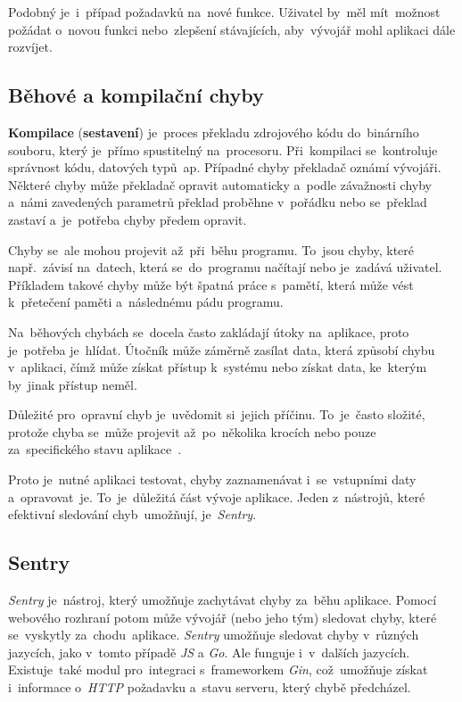 \documentclass[11pt,a4paper]{report}
\let\oldacrshort\acrshort
\renewcommand{\acrshort}[1]{\emph{\normalsize\color[rgb]{0,0,0}\noindent\oldacrshort{#1}}}
\begin{document}
                Podobný je~i~případ požadavků na~nové funkce. Uživatel by~měl mít~možnost požádat o~novou funkci nebo~zlepšení stávajících,
                aby~vývojář mohl aplikaci dále rozvíjet.

            \subsection{Běhové a kompilační chyby}
                \textbf{Kompilace} (\textbf{sestavení}) je~proces překladu zdrojového kódu do~binárního souboru, který je~přímo spustitelný na~procesoru. Při~kompilaci se~kontroluje správnost kódu, datových typů~ap. Případné chyby překladač oznámí vývojáři. Některé chyby může překladač opravit automaticky a~podle závažnosti chyby a~námi zavedených parametrů překlad proběhne v~pořádku nebo se~překlad zastaví a~je~potřeba chyby předem opravit.

                Chyby se~ale mohou projevit až~při~běhu programu. To~jsou chyby, které např.~závisí na~datech, která se~do~programu načítají nebo je~zadává uživatel. Příkladem takové chyby může být špatná práce s~pamětí, která může vést k~přetečení paměti a~následnému pádu programu.

                Na~běhových chybách se~docela často zakládají útoky na~aplikace, proto je~potřeba je~hlídat. Útočník může záměrně zasílat data, která způsobí chybu v~aplikaci, čímž může získat přístup k~systému nebo získat data, ke~kterým by~jinak přístup neměl.

                Důležité pro~opravní chyb je~uvědomit si~jejich příčinu. To~je~často složité, protože chyba se~může projevit až~po~několika krocích nebo pouze za~specifického stavu aplikace~\cite{graham2021ethical}.

                Proto je~nutné aplikaci testovat, chyby zaznamenávat i~se~vstupními daty a~opravovat~je. To~je~důležitá část vývoje aplikace. Jeden z~nástrojů, které efektivní sledování chyb~umožňují, je~\emph{Sentry}.

            \subsection{Sentry}
                \emph{Sentry} je~nástroj, který umožňuje zachytávat chyby za~běhu aplikace. Pomocí webového rozhraní potom může vývojář (nebo jeho tým) sledovat chyby, které se~vyskytly za~chodu~aplikace. \emph{Sentry} umožňuje sledovat chyby v~různých jazycích, jako v~tomto případě \acrshort{JS} a \emph{Go}. Ale funguje i~v~dalších jazycích. Existuje~také modul pro~integraci s~frameworkem \emph{Gin}, což~umožňuje získat i~informace o~\acrshort{HTTP} požadavku a~stavu serveru, který chybě předcházel.
                
\end{document}
